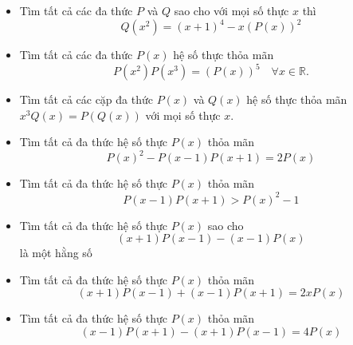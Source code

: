 \documentclass[11pt]{scrartcl}
\begin{document}
\begin{itemize}[label=, leftmargin=0em, itemsep=-0em]
        \item \begin{btvn}
            Tìm tất cả các đa thức $P$ và $Q$ sao cho với mọi số thực $x$ thì 
                $$
                Q\left(x^2\right)=(x+1)^4-x(P(x))^2
                $$
        \end{btvn}

        \item \begin{btvn}
        Tìm tất cả các đa thức $P(x)$ hệ số thực thỏa mãn
            $$
            P\left(x^2\right) P\left(x^3\right)=(P(x))^5 \quad \forall x \in \mathbb{R} .
            $$
        \end{btvn}

        \item \begin{btvn}
            Tìm tất cả các cặp đa thức $P(x)$ và $Q(x)$ hệ số thực thỏa mãn $x^3 Q(x)=P(Q(x))$ với mọi số thực $x$.
        \end{btvn}

        \item \begin{btvn}
            Tìm tất cả đa thức hệ số thực $P(x)$ thỏa mãn
            $$
            P(x)^2-P(x-1) P(x+1)=2 P(x)
            $$
        \end{btvn}

        \item \begin{btvn}
            Tìm tất cả đa thức hệ số thực $P(x)$ thỏa mãn
            $$
            P(x-1) P(x+1)>P(x)^2-1
            $$
        \end{btvn}

        \item \begin{btvn}
            Tìm tất cả đa thức hệ số thực $P(x)$ sao cho
            $$
            (x+1) P(x-1)-(x-1) P(x)
            $$
            là một hằng số
        \end{btvn}

        \item \begin{btvn}
            Tìm tất cả đa thức hệ số thực $P(x)$ thỏa mãn
            $$
            (x+1) P(x-1)+(x-1) P(x+1)=2 x P(x) 
            $$
        \end{btvn}

        \item \begin{btvn}
        Tìm tất cả đa thức hệ số thực $P(x)$ thỏa mãn
            $$
            (x-1) P(x+1)-(x+1) P(x-1)=4 P(x)
            $$
        \end{btvn}


\end{itemize}
\end{document}
